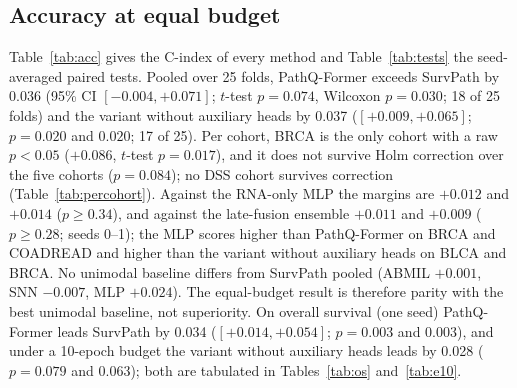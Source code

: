 \documentclass{article}
\newcommand{\pq}{PathQ-Former}
\newcommand{\cindex}{C-index}
\begin{document}
\subsection{Accuracy at equal budget}
\label{sec:accuracy}
Table~\ref{tab:acc} gives the \cindex{} of every method and Table~\ref{tab:tests} the seed-averaged paired tests. Pooled over 25 folds, \pq{} exceeds SurvPath by 0.036 (95\% CI $[-0.004, +0.071]$; $t$-test $p = 0.074$, Wilcoxon $p = 0.030$; 18 of 25 folds) and the variant without auxiliary heads by 0.037 ($[+0.009, +0.065]$; $p = 0.020$ and $0.020$; 17 of 25). Per cohort, BRCA is the only cohort with a raw $p < 0.05$ ($+0.086$, $t$-test $p = 0.017$), and it does not survive Holm correction over the five cohorts ($p = 0.084$); no DSS cohort survives correction (Table~\ref{tab:percohort}). Against the RNA-only MLP the margins are $+0.012$ and $+0.014$ ($p \ge 0.34$), and against the late-fusion ensemble $+0.011$ and $+0.009$ ($p \ge 0.28$; seeds 0--1); the MLP scores higher than \pq{} on BRCA and COADREAD and higher than the variant without auxiliary heads on BLCA and BRCA. No unimodal baseline differs from SurvPath pooled (ABMIL $+0.001$, SNN $-0.007$, MLP $+0.024$). The equal-budget result is therefore parity with the best unimodal baseline, not superiority. On overall survival (one seed) \pq{} leads SurvPath by 0.034 ($[+0.014, +0.054]$; $p = 0.003$ and $0.003$), and under a 10-epoch budget the variant without auxiliary heads leads by 0.028 ($p = 0.079$ and $0.063$); both are tabulated in Tables~\ref{tab:os} and~\ref{tab:e10}.
\end{document}
